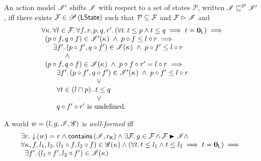 \begin{definition}An action model $\mathscr{I}'$  shifts $\mathscr{I}$ with respect to a set of states $\mathcal{P}$, written $\mathscr{I} \sqsubseteq^{\mathcal{P}} \mathscr{I}'$, iff there exists $\mathcal{F}_{} \in \mathscr{P}\left(\textsf{LState} \right)$ such that $\mathcal{P} \subseteq \mathcal{F}_{}$ and $\mathcal{F}_{} \mathrel{\rhd} \mathscr{I}$ and 
%
\[
\begin{array}{l}
	\hspace*{0.2cm}\forall \kappa_{}.\, \forall l \in \mathcal{F}_{}.\,  \forall f, r, p, q, r'.\, (\forall t.\, t \leq p \land t \leq q \implies t = \mathbf{0}_{\textsf{L}}) \implies\\
	\hspace*{0.2cm}
	\begin{array}{l}
		(p \circ f, q \circ f) \in \mathscr{I}'(\kappa_{}) 
		\;\land\; p \circ f \leq l \circ r \implies \\
		\hspace*{0.4cm}\exists f'.\, (p \circ f', q \circ f') \in \mathscr{I}(\kappa_{}) \;\land\; p \circ f' \leq l \circ r \\

		\hspace*{1cm} \land\\
		
		(p \circ f, q \circ f) \in \mathscr{I}(\kappa_{})
		\;\land\; p \circ f \circ r' = l \circ r \implies \\
		\hspace*{0.4cm}
		\begin{array}{l}
			\exists f'.\, (p \circ f', q \circ f') \in \mathscr{I}'(\kappa_{}) \;\land\; p \circ f' \leq l \circ r \\
			\hspace*{2cm} \lor\\
			\forall t \in \left( l \sqcap_{} p \right).\, t \leq q\\
			\hspace*{2cm} \lor\\
			q \circ f' \circ r' \text{ is undefined.}
			
		\end{array}

	\end{array}
	
	
\end{array}
\]
%
\end{definition}
%
%
\begin{definition}\label{def:wellformedness}
A world $w = (l, g, \mathscr{I}, \mathscr{G})$ is \emph{well-formed} iff
\[
\begin{array}{l}
	\exsts{r} \collapseW{w} = r  \land \contains{\lmod}{\capPart{r}} \land \exsts{\fence{}} g \in \fence{} \land \fence{} \strictfences \lmod\land\\
	\for{\ca{}, f, l_1, l_2} (l_1 \composeL f, l_2 \composeL f) \in \gmod(\ca{}) \land (\for{t} t \leq l_1 \land t \leq l_2 \implies t = \unitL) \implies\\
	\hspace{0.2cm}  \exsts{f'} (l_1 \composeL f', l_2 \composeL f') \in \lmod(\ca{}) 
\end{array}
\]
%
\end{definition}